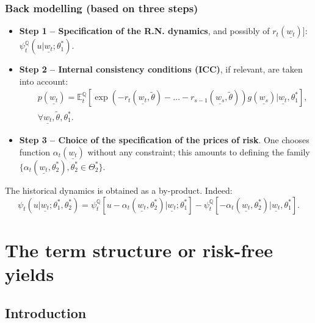 \documentclass[
  12pt,
]{book}
\providecommand{\tightlist}{%
  \setlength{\itemsep}{0pt}\setlength{\parskip}{0pt}}
\theoremstyle{definition}
\theoremstyle{definition}
\theoremstyle{definition}
\theoremstyle{definition}
\theoremstyle{remark}
\begin{document}
\hypertarget{back-modelling-based-on-three-steps}{%
\subsection{Back modelling (based on three steps)}\label{back-modelling-based-on-three-steps}}

\begin{itemize}
\tightlist
\item
  \textbf{Step 1 -- Specification of the R.N. dynamics}, and possibly of \(r_{t}(\underline{w_t})\){]}: \(\psi^{\mathbb{Q}}_t (u | \underline{w_t}; \theta^*_1)\).
\item
  \textbf{Step 2 -- Internal consistency conditions (ICC)}, if relevant, are taken into account:
  \begin{equation*}
  \begin{array}{lll}
  && p(\underline{w_t}) = \mathbb{E}^{\mathbb{Q}}_t \left[ \exp (-r_{t} (\underline{w_t},\tilde{\theta}) - \dots - r_{s-1} (\underline{w_s}, \tilde{\theta}))g(\underline{w_s}) | \underline{w_t} , \theta^*_1\right] ,\\
  && \forall    \underline{w_t} , \tilde{\theta} , \theta^*_1.
  \end{array}
  \end{equation*}
\item
  \textbf{Step 3 -- Choice of the specification of the prices of risk}. One chooses function \(\alpha_t(\underline{w_t})\) without any constraint; this amounts to defining the family \(\{ \alpha_t (\underline{w_t}, \theta^*_2), \theta^*_2\in \Theta^*_2 \}\).
\end{itemize}

The historical dynamics is obtained as a by-product. Indeed:
\begin{equation*}
\psi_t(u | \underline{w_t} ; \theta^*_1, \theta^*_2) = \psi_t^{\mathbb{Q}}\left[ u -\alpha_t (\underline{w_t}, \theta^*_2)|\underline{w_t} ; \theta^*_1 \right] -\psi^{\mathbb{Q}}_t \left[- \alpha_t (\underline{w_t}, \theta^*_2) | \underline{w_t},\theta^*_1 \right].
\end{equation*}

\hypertarget{the-term-structure-or-risk-free-yields}{%
\chapter{The term structure or risk-free yields}\label{the-term-structure-or-risk-free-yields}}

\hypertarget{RFIntroduction}{%
\section{Introduction}\label{RFIntroduction}}
\end{document}
